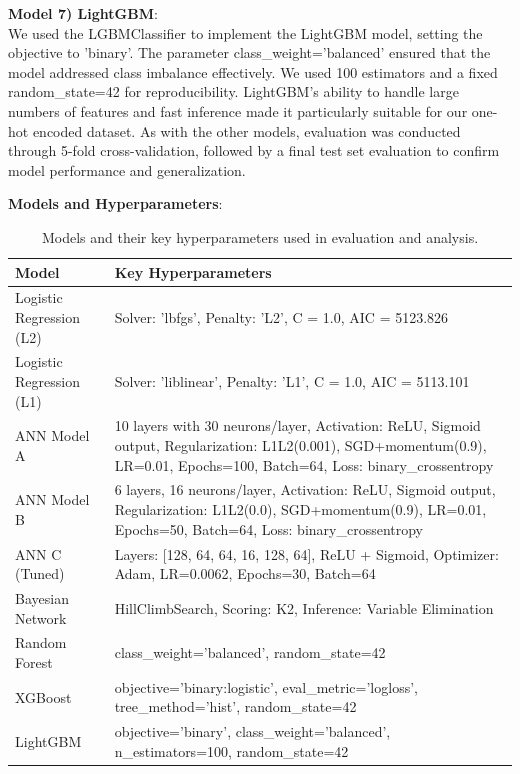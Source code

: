 \documentclass[conference]{IEEEtran}
\begin{document}
\noindent
\textbf{Model 7) LightGBM}:\\
We used the LGBMClassifier to implement the LightGBM model, setting the objective to 'binary'. The parameter class\_weight='balanced' ensured that the model addressed class imbalance effectively. We used 100 estimators and a fixed random\_state=42 for reproducibility. LightGBM’s ability to handle large numbers of features and fast inference made it particularly suitable for our one-hot encoded dataset. As with the other models, evaluation was conducted through 5-fold cross-validation, followed by a final test set evaluation to confirm model performance and generalization.

\vspace{1em}

\textbf{Models and Hyperparameters}:

\begin{table}[htbp]
  \centering
  \renewcommand{\arraystretch}{1.3}
  \begin{tabular}{|p{3.5cm}|p{3cm}|}
    \hline
    \textbf{Model} & \textbf{Key Hyperparameters} \\
    \hline
    Logistic Regression (L2) & Solver: 'lbfgs', Penalty: 'L2', C = 1.0, AIC = 5123.826 \\
    \hline
    Logistic Regression (L1) & Solver: 'liblinear', Penalty: 'L1', C = 1.0, AIC = 5113.101 \\
    \hline
    ANN Model A & 10 layers with 30 neurons/layer, Activation: ReLU, Sigmoid output, Regularization: L1L2(0.001), SGD+momentum(0.9), LR=0.01, Epochs=100, Batch=64, Loss: binary\_crossentropy \\
    \hline
    ANN Model B & 6 layers, 16 neurons/layer, Activation: ReLU, Sigmoid output, Regularization: L1L2(0.0), SGD+momentum(0.9), LR=0.01, Epochs=50, Batch=64, Loss: binary\_crossentropy \\
    \hline
    ANN C (Tuned) & Layers: [128, 64, 64, 16, 128, 64], ReLU + Sigmoid, Optimizer: Adam, LR=0.0062, Epochs=30, Batch=64 \\
    \hline
    Bayesian Network & HillClimbSearch, Scoring: K2, Inference: Variable Elimination \\
    \hline
    Random Forest & class\_weight='balanced', random\_state=42 \\
    \hline
    XGBoost & objective='binary:logistic', eval\_metric='logloss', tree\_method='hist', random\_state=42 \\
    \hline
    LightGBM & objective='binary', class\_weight='balanced', n\_estimators=100, random\_state=42 \\
    \hline
  \end{tabular}
  \caption{Models and their key hyperparameters used in evaluation and analysis.}
  \label{tab:model_params}
\end{table}
\end{document}
